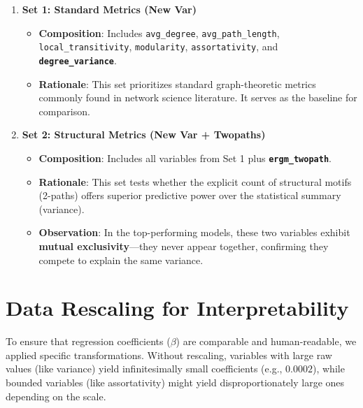 \documentclass{article}
\begin{document}
\begin{enumerate}
    \item \textbf{Set 1: Standard Metrics (New Var)}
    \begin{itemize}
        \item \textbf{Composition}: Includes \texttt{avg\_degree}, \texttt{avg\_path\_length}, \texttt{local\_transitivity}, \texttt{modularity}, \texttt{assortativity}, and \textbf{\texttt{degree\_variance}}.
        \item \textbf{Rationale}: This set prioritizes standard graph-theoretic metrics commonly found in network science literature. It serves as the baseline for comparison.
    \end{itemize}
    
    \item \textbf{Set 2: Structural Metrics (New Var + Twopaths)}
    \begin{itemize}
        \item \textbf{Composition}: Includes all variables from Set 1 plus \textbf{\texttt{ergm\_twopath}}.
        \item \textbf{Rationale}: This set tests whether the explicit count of structural motifs (2-paths) offers superior predictive power over the statistical summary (variance).
        \item \textbf{Observation}: In the top-performing models, these two variables exhibit \textbf{mutual exclusivity}—they never appear together, confirming they compete to explain the same variance.
    \end{itemize}
\end{enumerate}

\section{Data Rescaling for Interpretability}
To ensure that regression coefficients ($\beta$) are comparable and human-readable, we applied specific transformations. Without rescaling, variables with large raw values (like variance) yield infinitesimally small coefficients (e.g., $0.0002$), while bounded variables (like assortativity) might yield disproportionately large ones depending on the scale.
\end{document}
